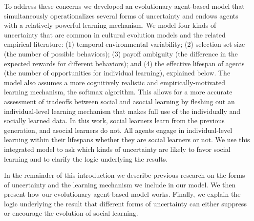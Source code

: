 \documentclass[letterpaper,11.5pt]{scrartcl}
\begin{document}
To address these concerns we developed an evolutionary agent-based model that
simultaneously operationalizes several forms of uncertainty and endows agents
with a relatively powerful learning mechanism. We model four kinds of
uncertainty that are common in cultural evolution models and the related empirical
literature:  (1) temporal environmental variability; (2) selection set size (the number of
possible behaviors); (3) payoff ambiguity (the difference in the expected rewards for
different behaviors); and (4) the effective lifespan of agents (the number of
opportunities for individual learning), explained below. The model also assumes a more
cognitively realistic and empirically-motivated learning mechanism, the softmax algorithm.
This allows for a more accurate assessment of tradeoffs between 
social and asocial learning
by fleshing out an individual-level learning mechanism that makes full use of 
the individually and socially learned data. 
In this work, social learners learn from the previous generation, and 
asocial learners do not. All agents engage in individual-level learning within
their lifespans whether they are social learners or not.
We use this integrated model to ask which kinds of uncertainty are likely to
favor social learning and to clarify the logic underlying the results.

In the remainder of this introduction we describe previous research on the forms of uncertainty and the learning mechanism we include in our model. We then present how our evolutionary agent-based model works. Finally, we explain the logic underlying the result that different forms of uncertainty can either suppress or encourage the evolution of social learning. 
\end{document}
